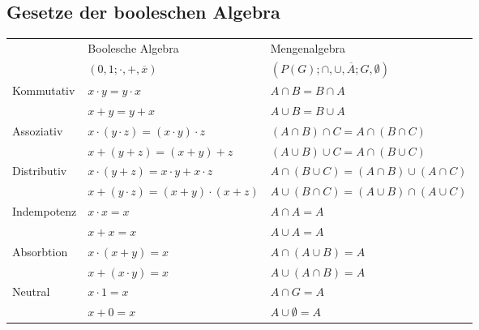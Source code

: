 \documentclass[6pt,a4paper]{scrartcl}
\begin{document}
\begin{multicols*}{3}
	\subsection{Gesetze der booleschen Algebra}
	\begin{tabular}{l|l|l}
		            & Boolesche Algebra                                     & Mengenalgebra                                         \\
		            & $({0,1};\cdot , +, \overline{x})$                     & $(P(G);\cap , \cup, \overline{A};G,\emptyset )$       \\ \hline
		Kommutativ  & $x \cdot y = y \cdot x$                               & $A \cap B = B \cap A$                                 \\
		            & $x + y = y + x$                                       & $A \cup B = B \cup A$                                 \\
		Assoziativ  & $x \cdot (y \cdot z) = (x \cdot y) \cdot z$           & $(A \cap B) \cap C = A \cap (B \cap C)$               \\
		            & $x + (y + z) = (x + y) + z$                           & $(A \cup B) \cup C = A \cap (B \cup C)$               \\
		Distributiv & $x \cdot (y + z) = x \cdot y + x \cdot z$             & $A \cap (B \cup C) = (A \cap B) \cup (A \cap C)$      \\
		            & $x + (y \cdot z) = (x + y) \cdot (x + z)$             & $A \cup (B \cap C) = (A \cup B) \cap (A \cup C)$      \\
		Indempotenz & $x \cdot x = x$                                       & $A \cap A = A$                                        \\
		            & $x + x = x$                                           & $A \cup A = A$                                        \\
		Absorbtion  & $x \cdot (x+y) = x$                                   & $A \cap (A \cup B) = A$                               \\
		            & $x + (x \cdot y) = x$                                 & $A \cup (A \cap B) = A$                               \\
		Neutral     & $x \cdot 1 = x$                                       & $A \cap G = A$                                        \\
		            & $x + 0 = x$                                           & $A \cup \emptyset = A$                                \\

\end{tabular}
\end{multicols*}
\end{document}
